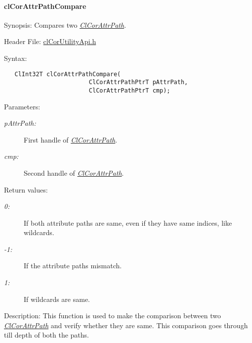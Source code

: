 \hypertarget{pagecor266}{}\paragraph{cl\-Cor\-Attr\-Path\-Compare}\label{pagecor266}
\begin{Desc}
\item[Synopsis:]Compares two {\em \hyperlink{struct_cl_cor_attr_path}{Cl\-Cor\-Attr\-Path}\/}.\end{Desc}
\begin{Desc}
\item[Header File:]\hyperlink{cl_cor_utility_api_8h}{cl\-Cor\-Utility\-Api.h}\end{Desc}
\begin{Desc}
\item[Syntax:]

\footnotesize\begin{verbatim}   ClInt32T clCorAttrPathCompare(
                        ClCorAttrPathPtrT pAttrPath,
                        ClCorAttrPathPtrT cmp);
\end{verbatim}
\normalsize
\end{Desc}
\begin{Desc}
\item[Parameters:]
\begin{description}
\item[{\em p\-Attr\-Path:}]First handle of {\em \hyperlink{struct_cl_cor_attr_path}{Cl\-Cor\-Attr\-Path}\/}. \item[{\em cmp:}]Second handle of {\em \hyperlink{struct_cl_cor_attr_path}{Cl\-Cor\-Attr\-Path}\/}.\end{description}
\end{Desc}
\begin{Desc}
\item[Return values:]
\begin{description}
\item[{\em 0:}]If both attribute paths are same, even if they have same indices, like wildcards. \item[{\em -1:}]If the attribute paths mismatch. \item[{\em 1:}]If wildcards are same.\end{description}
\end{Desc}
\begin{Desc}
\item[Description:]This function is used to make the comparison between two {\em \hyperlink{struct_cl_cor_attr_path}{Cl\-Cor\-Attr\-Path}\/} and verify whether they are same. This comparison goes through till depth of both the paths.\end{Desc}
